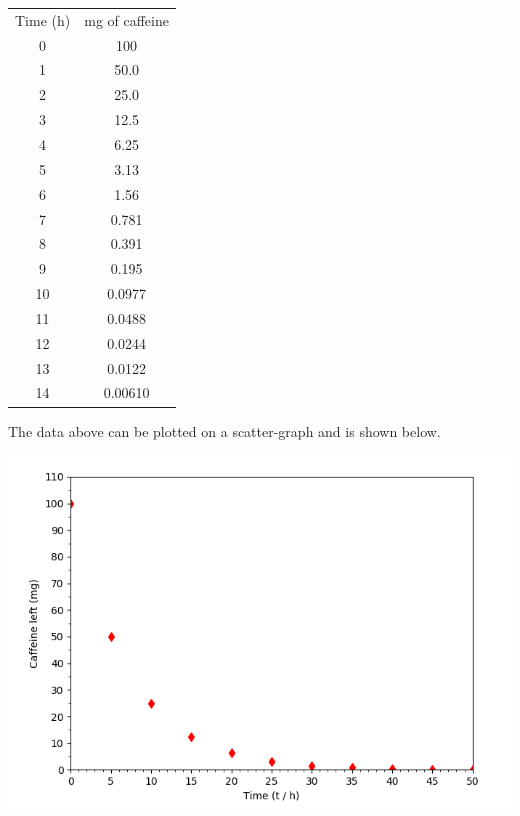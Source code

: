 \documentclass[12pt]{article}
\begin{document}
                \begin{center}
                        \begin{tabular}{cc}
                        Time (h) & mg of caffeine       \\
                        0 & 100  \\ 
                        1 & 50.0  \\ 
                        2 & 25.0   \\
                        3 & 12.5    \\ 
                        4 & 6.25     \\ 
                        5 & 3.13      \\ 
                        6 & 1.56       \\
                        7 & 0.781       \\
                        8 & 0.391        \\
                        9 & 0.195         \\ 
                        10 & 0.0977        \\ 
                        11 & 0.0488         \\ 
                        12 & 0.0244          \\ 
                        13 & 0.0122           \\
                        14 & 0.00610           \\
                        
                                           
                        \end{tabular}
                        
                \end{center}
                
                The data above can be plotted on a scatter-graph and is shown below.
                
                \begin{center}
                        \includegraphics[scale=0.8]{table1.png}
                \end{center}
\end{document}
